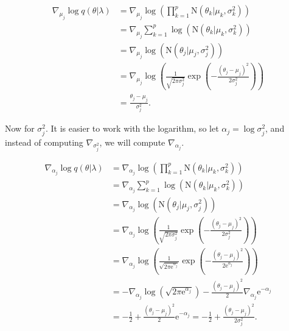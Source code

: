 \begin{equation*}
  \begin{split}
      \nabla_{\mu_j} \log q(\theta | \lambda) & =
      \nabla_{\mu_j} \log \left( \prod_{ k = 1}^p \mathrm{N} \left( \theta_k | \mu_k, \sigma_k^2 \right) \right) \\
      &= \nabla_{\mu_j} \sum_{ k = 1}^p \log \left( \mathrm{N} \left( \theta_k | \mu_k, \sigma_k^2 \right) \right) \\
      &= \nabla_{\mu_j} \log \left( \mathrm{N} \left( \theta_j | \mu_j, \sigma_j^2 \right) \right) \\
      &= \nabla_{\mu_j} \log \left( \frac{1}{\sqrt{2 \pi \sigma_j^2}} \exp \left( -\frac{(\theta_j - \mu_j)^2}{2 \sigma_j^2} \right) \right) \\
      &= \frac{\theta_j - \mu_j}{\sigma_j^2}.
  \end{split}
\end{equation*}

Now for $\sigma_j^2$. It is easier to work with the logarithm, so let $\alpha_j = \log \sigma_j^2$, and instead of computing $\nabla_{\sigma_j^2}$, we will compute $\nabla_{\alpha_j}$.

\begin{equation*}
  \begin{split}
      \nabla_{\alpha_j} \log q(\theta | \lambda) & =
      \nabla_{\alpha_j} \log \left( \prod_{ k = 1}^p \mathrm{N} \left( \theta_k | \mu_k, \sigma_k^2 \right) \right) \\
      &= \nabla_{\alpha_j} \sum_{ k = 1}^p \log \left( \mathrm{N} \left( \theta_k | \mu_k, \sigma_k^2 \right) \right) \\
      &= \nabla_{\alpha_j} \log \left( \mathrm{N} \left( \theta_j | \mu_j, \sigma_j^2 \right) \right) \\
      &= \nabla_{\alpha_j} \log \left( \frac{1}{\sqrt{2 \pi \sigma_j^2}} \exp \left( -\frac{(\theta_j - \mu_j)^2}{2 \sigma_j^2} \right) \right) \\
      &= \nabla_{\alpha_j} \log \left( \frac{1}{\sqrt{2 \pi \mathrm{e}^{\alpha_j}}} \exp \left( -\frac{(\theta_j - \mu_j)^2}{2 \mathrm{e}^{\alpha_j}} \right) \right) \\
      &= - \nabla_{\alpha_j} \log \left( \sqrt{2 \pi \mathrm{e}^{\alpha_j}} \right) - \frac{(\theta_j - \mu_j)^2}{2} \nabla_{\alpha_j} \mathrm{e}^{-\alpha_j}\\
      &= - \frac{1}{2} + \frac{(\theta_j - \mu_j)^2}{2} \mathrm{e}^{-\alpha_j} =
      - \frac{1}{2} + \frac{(\theta_j - \mu_j)^2}{2 \sigma_j^2}.
  \end{split}
\end{equation*}

